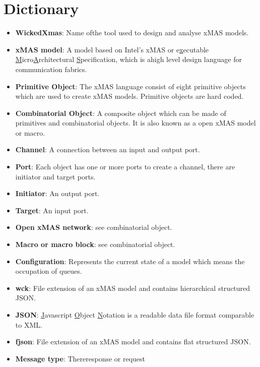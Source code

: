 \documentclass[a4paper,11pt,final]{article}
\begin{document}
\section{Dictionary}
\begin{itemize}
	\item \textbf{WickedXmas}: Name ofthe tool used to design and analyse xMAS models.
	\item \textbf{xMAS model}: A model based on Intel's xMAS or e\underline{x}ecutable \underline{M}icro\underline{A}rchitectural \underline{S}pecification, which is ahigh level design language for communication fabrics.
	\item \textbf{Primitive Object}: The xMAS language consist of eight primitive objects which are used to create xMAS models. Primitive objects are hard coded.
	\item \textbf{Combinatorial Object}: A composite object which can be made of primitives and combinatorial objects. It is also known as a open xMAS model or macro.
	\item \textbf{Channel}: A connection between an input and output port.
	\item \textbf{Port}: Each object has one or more ports to create a channel, there are initiator and target ports.
	\item \textbf{Initiator}: An output port.
	\item \textbf{Target}: An input port.
	\item \textbf{Open xMAS network}: see combinatorial object.
	\item \textbf{Macro or macro block}: see combinatorial object.
	\item \textbf{Configuration}: Represents the current state of a model which means the occupation of queues.
	\item \textbf{wck}: File extension of an xMAS model and contains hierarchical structured JSON.
	\item \textbf{JSON}: \underline{J}avascript \underline{O}bject \underline{N}otation is a readable data file format comparable to XML.
	\item \textbf{fjson}: File extension of an xMAS model and contains flat structured JSON.
	\item \textbf{Message type}: Thereresponse or request
\end{itemize}
\end{document}
